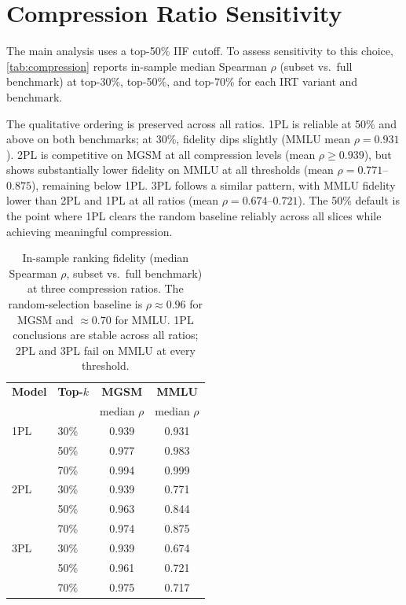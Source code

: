 \documentclass[11pt]{article}
\begin{document}
\section{Compression Ratio Sensitivity}
\label{app:compression}

The main analysis uses a top-50\% IIF cutoff. To assess sensitivity to this
choice, \autoref{tab:compression} reports in-sample median Spearman $\rho$
(subset vs.\ full benchmark) at top-30\%, top-50\%, and top-70\% for each
IRT variant and benchmark.

The qualitative ordering is preserved across all ratios. 1PL is reliable at
50\% and above on both benchmarks; at 30\%, fidelity dips slightly (MMLU mean $\rho = 0.931$).
2PL is competitive on MGSM at all compression levels (mean $\rho \geq 0.939$), but shows
substantially lower fidelity on MMLU at all thresholds (mean $\rho = 0.771$--$0.875$),
remaining below 1PL. 3PL follows a similar pattern, with MMLU fidelity
lower than 2PL and 1PL at all ratios (mean $\rho = 0.674$--$0.721$).
The 50\% default is the point where 1PL clears the random baseline
reliably across all slices while achieving meaningful compression.

\begin{table}[h]
  \centering
  \small
  \begin{tabular}{llcc}
    \toprule
    \textbf{Model} & \textbf{Top-$k$} & \textbf{MGSM} & \textbf{MMLU} \\
                   &                  & median $\rho$ & median $\rho$ \\
    \midrule
    1PL & 30\% & 0.939 & 0.931 \\
        & 50\% & 0.977 & 0.983 \\
        & 70\% & 0.994 & 0.999 \\
    \midrule
    2PL & 30\% & 0.939 & 0.771 \\
        & 50\% & 0.963 & 0.844 \\
        & 70\% & 0.974 & 0.875 \\
    \midrule
    3PL & 30\% & 0.939 & 0.674 \\
        & 50\% & 0.961 & 0.721 \\
        & 70\% & 0.975 & 0.717 \\
    \bottomrule
  \end{tabular}
  \caption{In-sample ranking fidelity (median Spearman $\rho$, subset
    vs.\ full benchmark) at three compression ratios. The random-selection
    baseline is $\rho \approx 0.96$ for MGSM and $\approx 0.70$ for MMLU.
    1PL conclusions are stable across all ratios; 2PL and 3PL fail on MMLU
    at every threshold.}
  \label{tab:compression}
\end{table}
\end{document}
